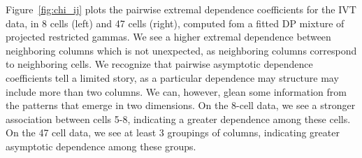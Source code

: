 Figure~\ref{fig:chi_ij} plots the pairwise extremal dependence coefficients for the IVT data, in 8
  cells (left) and 47 cells (right), computed fom a fitted DP mixture of projected restricted gammas.
  We see a higher extremal dependence between neighboring columns which is not unexpected, as
  neighboring columns correspond to neighboring cells.  We recognize that pairwise asymptotic dependence
  coefficients tell a limited story, as a particular dependence may structure may include more than
  two columns.   We can, however, glean some information from the patterns that emerge in two dimensions.
  On the 8-cell data, we see a stronger association between cells 5-8, indicating a greater
  dependence among these cells.  On the 47 cell data, we see at least 3 groupings of columns,
  indicating greater asymptotic dependence among these groups.

